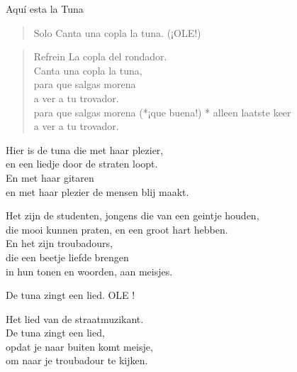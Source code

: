 \begin{song}{Aquí esta la Tuna}
\begin{verse}{Solo}
Canta una copla la tuna. (¡OLE!)
\end{verse}
\begin{verse}{Refrein}
\hspace{1em}La copla del rondador.\\
Canta una copla la tuna,\\
para que salgas morena\\
a ver a tu trovador.\\
para que salgas morena (*¡que buena!)\hspace{2em} * alleen laatste keer\\
a ver a tu trovador.\hspace{1em}
\end{verse}

\end{song}
\clearpage
\begin{translation}
Hier is de tuna die met haar plezier,\\
en een liedje door de straten loopt.\\
En met haar gitaren\\
en met haar plezier de mensen blij maakt.\vspace{\wlskip}

Het zijn de studenten, jongens die van een geintje houden,\\
die mooi kunnen praten, en een groot hart hebben.\\
En het zijn troubadours,\\
die een beetje liefde brengen\\
in hun tonen en woorden, aan meisjes.\vspace{\wlskip}

De tuna zingt een lied. OLE !\vspace{\wlskip}

Het lied van de straatmuzikant.\\
De tuna zingt een lied,\\
opdat je naar buiten komt meisje,\\
om naar je troubadour te kijken.
\end{translation}
